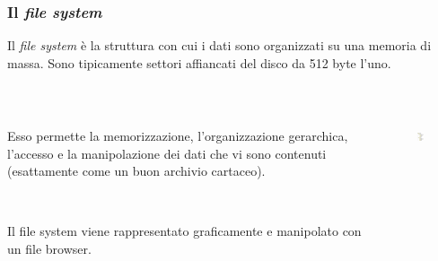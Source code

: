 \documentclass[]{beamer}
\begin{document}
\begin{frame}
\frametitle{Il \emph{file system}}
Il \emph{file system} è la \alert<1>{struttura con cui i dati sono organizzati su una memoria di massa}. Sono tipicamente settori affiancati del disco da 512 byte l'uno.\pause

~

\begin{columns}
  \begin{column}{.65\textwidth}
    Esso permette la memorizzazione, l'\alert<2>{organizzazione gerarchica}, l'accesso e la manipolazione dei dati che vi sono contenuti (esattamente come un buon archivio cartaceo).\pause
    
    ~
    
    Il file system viene rappresentato graficamente e manipolato con un \alert<3>{file browser}.
  \end{column}
  \begin{column}{.3\textwidth}
      \begin{figure}
        \includegraphics[width=\columnwidth]{img/albero.png}
      \end{figure}
  \end{column}
\end{columns}
\end{frame}
\end{document}
